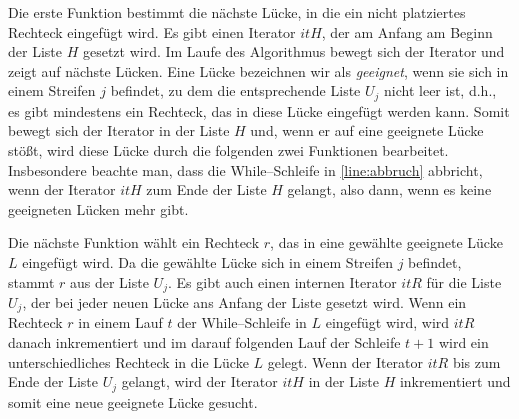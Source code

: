 Die erste Funktion bestimmt die nächste Lücke, in die ein nicht platziertes Rechteck 
eingefügt wird. Es gibt einen Iterator $itH$, der am Anfang am Beginn der Liste $H$ gesetzt wird.
Im Laufe des Algorithmus bewegt sich der Iterator und zeigt auf nächste Lücken.
Eine Lücke bezeichnen wir als \textit{geeignet}, wenn sie sich in einem
Streifen $j$ befindet, zu dem die entsprechende Liste $U_j$ nicht leer ist, d.h., 
es gibt mindestens ein Rechteck, das in diese Lücke eingefügt werden kann.
Somit bewegt sich der Iterator in der Liste $H$ und, wenn er auf eine geeignete Lücke 
stößt, wird diese Lücke durch die folgenden zwei Funktionen bearbeitet.
Insbesondere beachte man, dass die While--Schleife in \cref{line:abbruch} abbricht, wenn
der Iterator $itH$ zum Ende der Liste $H$ gelangt, also dann,
wenn es keine geeigneten Lücken mehr gibt. 

Die nächste Funktion wählt ein Rechteck $r$, das in eine gewählte geeignete Lücke $L$
eingefügt wird. Da die gewählte Lücke sich in einem Streifen $j$ befindet, stammt $r$
aus der Liste $U_j$.
Es gibt auch einen internen Iterator $itR$ für die Liste $U_j$,
der bei jeder neuen Lücke ans Anfang der Liste gesetzt wird.
Wenn ein Rechteck $r$ in einem Lauf $t$ der While--Schleife in $L$ eingefügt wird,
wird $itR$ danach inkrementiert und im darauf folgenden Lauf der 
Schleife $t+1$ wird ein unterschiedliches Rechteck in die Lücke $L$ gelegt.
Wenn der Iterator $itR$ bis zum Ende der Liste $U_j$ gelangt, wird der Iterator $itH$
in der Liste $H$ inkrementiert und somit eine neue 
geeignete Lücke gesucht.

